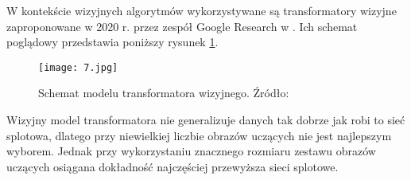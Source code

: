 W kontekście wizyjnych algorytmów wykorzystywane są transformatory wizyjne zaproponowane w 2020 r. przez zespół Google Research w \cite{dosovitskiy2020}. Ich schemat poglądowy przedstawia poniższy rysunek \ref{fig:schemat-vit}.
\begin{figure}[H]
    \centering
    \texttt{[image: 7.jpg]}
    \caption{Schemat modelu transformatora wizyjnego. Źródło: \cite{dosovitskiy2020}}
    \label{fig:schemat-vit}
\end{figure}
Wizyjny model transformatora nie generalizuje danych tak dobrze jak robi to sieć splotowa, dlatego przy niewielkiej liczbie obrazów uczących nie jest najlepszym wyborem. Jednak przy wykorzystaniu znacznego rozmiaru zestawu obrazów uczących osiągana dokładność najczęściej przewyższa sieci splotowe.
